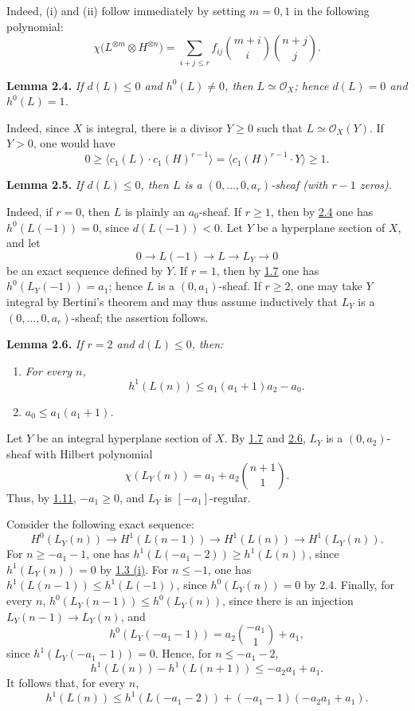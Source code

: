 Indeed, (i) and (ii) follow immediately by setting \(m=0,1\) in the
following polynomial:
\[
\chi\bigl(L^{\otimes m}\otimes H^{\otimes n}\bigr)
=\sum_{i+j\le r}f_{ij}
\binom{m+i}{i}\binom{n+j}{j}.
\]

\textbf{Lemma 2.4.} \emph{If \(d(L)\le0\) and \(h^0(L)\ne0\), then
\(L\simeq\mathcal O_X\); hence \(d(L)=0\) and \(h^0(L)=1\).}

Indeed, since \(X\) is integral, there is a divisor \(Y\ge0\) such that
\(L\simeq\mathcal O_X(Y)\). If \(Y>0\), one would have
\[
0\ge
\bigl\langle c_1(L)\cdot c_1(H)^{r-1}\bigr\rangle
=\bigl\langle c_1(H)^{r-1}\cdot Y\bigr\rangle
\ge1.
\]

\textbf{Lemma 2.5.} \emph{If \(d(L)\le0\), then \(L\) is a
\((0,\ldots,0,a_r)\)-sheaf (with \(r-1\) zeros).}

Indeed, if \(r=0\), then \(L\) is plainly an \(a_0\)-sheaf. If
\(r\ge1\), then by \hyperlink{sga6.e13.lem.2-4}{2.4} one has \(h^0(L(-1))=0\), since
\(d(L(-1))<0\). Let \(Y\) be a hyperplane section of \(X\), and let
\[
0\longrightarrow L(-1)\longrightarrow L\longrightarrow L_Y
\longrightarrow0
\]
be an exact sequence defined by \(Y\). If \(r=1\), then by \hyperlink{sga6.e13.lem.1-7}{1.7} one has
\(h^0(L_Y(-1))=a_1\); hence \(L\) is a \((0,a_1)\)-sheaf. If \(r\ge2\),
one may take \(Y\) integral by Bertini's theorem and may thus assume
inductively that \(L_Y\) is a \((0,\ldots,0,a_r)\)-sheaf; the assertion
follows.

\textbf{Lemma 2.6.} \emph{If \(r=2\) and \(d(L)\le0\), then:}
\begin{enumerate}[label=(\roman*)]
\item \emph{For every \(n\),
\[
h^1(L(n))\le a_1(a_1+1)a_2-a_0.
\]}
\item \emph{\(a_0\le a_1(a_1+1)\).}
\end{enumerate}

Let \(Y\) be an integral hyperplane section of \(X\). By \hyperlink{sga6.e13.lem.1-7}{1.7} and \hyperlink{sga6.e13.lem.2-6}{2.6},
\(L_Y\) is a \((0,a_2)\)-sheaf with Hilbert polynomial
\[
\chi(L_Y(n))=a_1+a_2\binom{n+1}{1}.
\]
Thus, by \hyperlink{sga6.e13.thm.1-11}{1.11}, \(-a_1\ge0\), and \(L_Y\) is
\([-a_1]\)-regular.

Consider the following exact sequence:
\[
H^0(L_Y(n))\longrightarrow H^1(L(n-1))
\longrightarrow H^1(L(n))\longrightarrow H^1(L_Y(n)).
\]
For \(n\ge-a_1-1\), one has
\(h^1(L(-a_1-2))\ge h^1(L(n))\), since \(h^1(L_Y(n))=0\) by \hyperlink{sga6.e13.prop.1-3}{1.3 (i)}.
For \(n\le-1\), one has
\(h^1(L(n-1))\le h^1(L(-1))\), since \(h^0(L_Y(n))=0\) by 2.4.
Finally, for every \(n\),
\(h^0(L_Y(n-1))\le h^0(L_Y(n))\), since there is an injection
\(L_Y(n-1)\to L_Y(n)\), and
\[
h^0(L_Y(-a_1-1))=a_2\binom{-a_1}{1}+a_1,
\]
since \(h^1(L_Y(-a_1-1))=0\). Hence, for \(n\le-a_1-2\),
\[
h^1(L(n))-h^1(L(n+1))\le -a_2a_1+a_1.
\]
It follows that, for every \(n\),
\begin{equation}
h^1(L(n))\le
h^1(L(-a_1-2))+(-a_1-1)(-a_2a_1+a_1).
\tag{2.6.1}
\end{equation}


